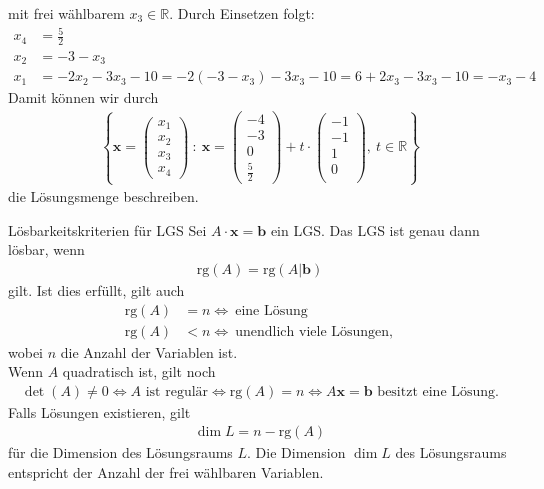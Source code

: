 mit frei wählbarem $x_3 \in \mathbb{R}$.
Durch Einsetzen folgt:
\begin{align*}
x_4 &= \frac{5}{2}\\
x_2 &= -3 -x_3 \\
x_1 &= -2 x_2 - 3 x_3 - 10  = -2 (-3 - x_3)  - 3 x_3 -10 
= 6 + 2 x_3 - 3 x_3 - 10
= - x_3 - 4
\end{align*}
Damit können wir durch
\begin{align*}
\left\lbrace
\textbf{x} =
\begin{pmatrix}
x_1 \\
x_2 \\
x_3 \\ 
x_4
\end{pmatrix}
\ : \ 
\textbf{x} 
=
\begin{pmatrix}
-4\\
-3\\
0\\
\frac{5}{2}
\end{pmatrix}
+ t \cdot 
\begin{pmatrix}
-1\\
-1\\
1\\
0\\
\end{pmatrix},
\ t \in \mathbb{R}
\right\rbrace
\end{align*}
die Lösungsmenge beschreiben.\\
\begin{mybox}{Lösbarkeitskriterien für LGS}
Sei $A \cdot \textbf{x} = \textbf{b}$ ein LGS.
Das LGS ist genau dann lösbar, 
wenn
\begin{align*}
\mathrm{rg}(A) = \mathrm{rg}(A|\textbf{b})
\end{align*}
gilt.
Ist dies erfüllt, gilt auch
\begin{align*}
\mathrm{rg}(A) &= n \Leftrightarrow \ \text{eine Lösung}\\
\mathrm{rg}(A) &< n \Leftrightarrow \ \text{unendlich viele Lösungen},
\end{align*}
wobei $n$ die Anzahl der Variablen ist.\\
Wenn $A$ quadratisch ist, gilt noch
\begin{align*}
\det(A) \neq 0 
\Leftrightarrow
A \text{ ist regulär}
\Leftrightarrow
\mathrm{rg}(A)=n
\Leftrightarrow
A \textbf{x} = \textbf{b} \text{ besitzt eine Lösung}.
\end{align*}
Falls Lösungen existieren, gilt
\begin{align*}
\dim L = n - \mathrm{rg}(A)
\end{align*}
für die Dimension des Lösungsraums $L$.
Die Dimension $\dim L$ des Lösungsraums entspricht der Anzahl der frei wählbaren Variablen.
\end{mybox}

